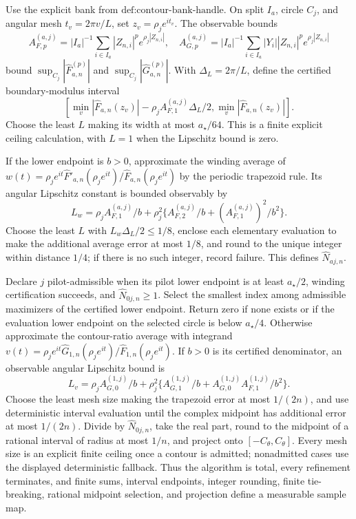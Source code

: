 Use the explicit bank from \(\text{def:contour-bank-handle}\).  On split \(I_a\), circle \(C_j\), and angular mesh \(t_v=2\pi v/L\), set \(z_v=\rho_je^{it_v}\).  The observable bounds
\[
 A_{F,p}^{(a,j)}=|I_a|^{-1}\sum_{i\in I_a}|Z_{n,i}|^p e^{\rho_j|Z_{n,i}|},
 \quad
 A_{G,p}^{(a,j)}=|I_a|^{-1}\sum_{i\in I_a}|Y_i||Z_{n,i}|^p e^{\rho_j|Z_{n,i}|}
\]
bound \(\sup_{C_j}|\widehat F_{a,n}^{(p)}|\) and \(\sup_{C_j}|\widehat G_{a,n}^{(p)}|\).  With \(\Delta_L=2\pi/L\), define the certified boundary-modulus interval
\[
 \left[\min_v|\widehat F_{a,n}(z_v)|-\rho_jA_{F,1}^{(a,j)}\Delta_L/2,
       \min_v|\widehat F_{a,n}(z_v)|\right].
\]
Choose the least \(L\) making its width at most \(a_{\star}/64\).  This is a finite explicit ceiling calculation, with \(L=1\) when the Lipschitz bound is zero.

If the lower endpoint is \(b>0\), approximate the winding average of
\(w(t)=\rho_je^{it}\widehat F'_{a,n}(\rho_je^{it})/\widehat F_{a,n}(\rho_je^{it})\) by the periodic trapezoid rule.  Its angular Lipschitz constant is bounded observably by
\[
 L_w=\rho_jA_{F,1}^{(a,j)}/b+
 \rho_j^2\{A_{F,2}^{(a,j)}/b+(A_{F,1}^{(a,j)})^2/b^2\}.
\]
Choose the least \(L\) with \(L_w\Delta_L/2\le1/8\), enclose each elementary evaluation to make the additional average error at most \(1/8\), and round to the unique integer within distance \(1/4\); if there is no such integer, record failure.  This defines \(\widehat N_{aj,n}\).

Declare \(j\) pilot-admissible when its pilot lower endpoint is at least \(a_{\star}/2\), winding certification succeeds, and \(\widehat N_{0j,n}\ge1\).  Select the smallest index among admissible maximizers of the certified lower endpoint.  Return zero if none exists or if the evaluation lower endpoint on the selected circle is below \(a_{\star}/4\).  Otherwise approximate the contour-ratio average with integrand \(v(t)=\rho_je^{it}\widehat G_{1,n}(\rho_je^{it})/\widehat F_{1,n}(\rho_je^{it})\).  If \(b>0\) is its certified denominator, an observable angular Lipschitz bound is
\[
 L_v=\rho_jA_{G,0}^{(1,j)}/b+
 \rho_j^2\{A_{G,1}^{(1,j)}/b+A_{G,0}^{(1,j)}A_{F,1}^{(1,j)}/b^2\}.
\]
Choose the least mesh size making the trapezoid error at most \(1/(2n)\), and use deterministic interval evaluation until the complex midpoint has additional error at most \(1/(2n)\).  Divide by \(\widehat N_{0j,n}\), take the real part, round to the midpoint of a rational interval of radius at most \(1/n\), and project onto \([-C_{\theta},C_{\theta}]\).  Every mesh size is an explicit finite ceiling once a contour is admitted; nonadmitted cases use the displayed deterministic fallback.  Thus the algorithm is total, every refinement terminates, and finite sums, interval endpoints, integer rounding, finite tie-breaking, rational midpoint selection, and projection define a measurable sample map.